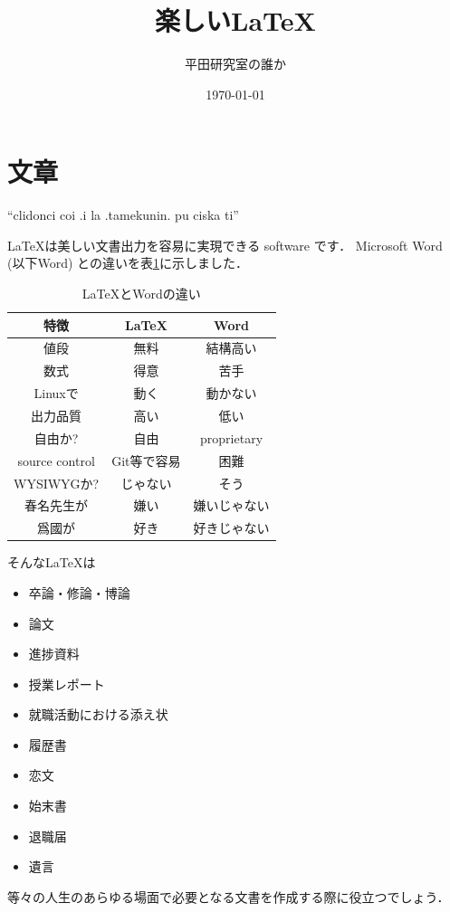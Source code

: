 \documentclass[lualatex,a4paper,ja = standard, twoside, twocolumn]{bxjsarticle}
\title{楽しい\LaTeX}
\author{平田研究室の誰か}
\date{\today}
\begin{document}
\maketitle
\section{文章}
  ``clidonci coi .i la .tamekunin. pu ciska ti''
  \par \LaTeX は美しい文書出力を容易に実現できる software です．
  Microsoft Word (以下Word) との違いを表\ref{tbl_latexVsWord}に示しました．
    \begin{table}[b]
      \center
      \caption{\LaTeX とWordの違い} \label{tbl_latexVsWord}
      \begin{tabular}{c||c|c}
        特徴 & \LaTeX & Word \\ \hline
        値段 & 無料 & 結構高い \\
        数式 & 得意 & 苦手 \\
        Linuxで & 動く & 動かない \\
        出力品質 & 高い & 低い \\
        自由か? & 自由 & proprietary \\
        source control & Git等で容易 & 困難 \\
        WYSIWYGか? & じゃない & そう \\
        春名先生が & 嫌い & 嫌いじゃない \\
        爲國が & 好き & 好きじゃない
      \end{tabular}
    \end{table}
  そんな\LaTeX は
    \begin{itemize}
      \item 卒論・修論・博論
      \item 論文
      \item 進捗資料
      \item 授業レポート
      \item 就職活動における添え状
      \item 履歴書
      \item 恋文
      \item 始末書
      \item 退職届
      \item 遺言
    \end{itemize}
  等々の人生のあらゆる場面で必要となる文書を作成する際に役立つでしょう．
\end{document}
